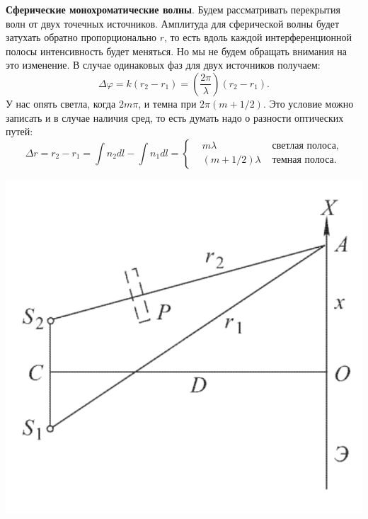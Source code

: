 \textbf{Сферические монохроматические волны}. Будем рассматривать перекрытия волн от двух точечных источников. Амплитуда для сферической волны будет затухать обратно пропорционально $r$, то есть вдоль каждой интерференционной полосы  интенсивность будет меняться. Но мы не будем обращать внимания на это изменение.
В случае одинаковых фаз для двух источников получаем:
\begin{equation*}
	\Delta \varphi = k (r_2 - r_1) = \left(\frac{2 \pi}{\lambda}\right) (r_2 - r_1).
\end{equation*}
У нас опять светла, когда $2 m \pi$, и темна при $2 \pi (m +1/2)$. Это условие можно записать и в случае наличия сред, то есть думать надо о разности оптических путей:
\begin{equation*}
	\Delta r = r_2 - r_1 = \int n_2 d l - \int n_1 d l
	=
	\left\{
	\begin{aligned}
		&m \lambda &\text{ светлая полоса}, \\
		&(m+ 1/2)\lambda &\text{ темная полоса}.
	\end{aligned}
	\right.
\end{equation*}
\begin{minipage}{0.35\textwidth}
    \includegraphics[width=1\textwidth]{figures/s26_2.png}
\end{minipage}
\hfill
